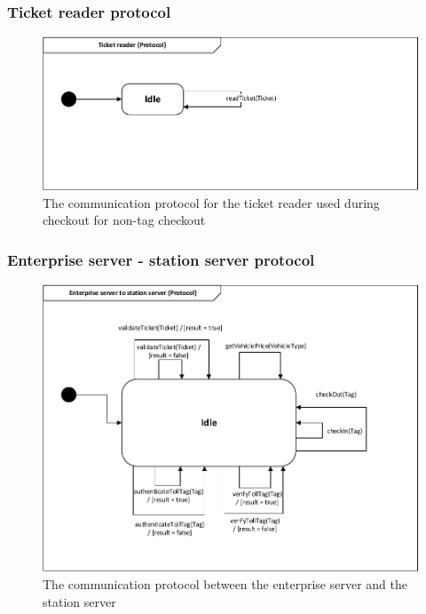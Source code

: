 \subsubsection*{Ticket reader protocol}
\begin{figure}[H]
\centering
\includegraphics[width=0.7\linewidth]{img/behaviour_state_machines/protocol_state_machines/protocol_state_machine_ticket_reader}
\caption{The communication protocol for the ticket reader used during checkout for non-tag checkout}
\label{fig:protocol_state_machine_ticket_reader}
\end{figure}

\subsubsection*{Enterprise server - station server protocol}
\begin{figure}[H]
\centering
\includegraphics[width=0.7\linewidth]{img/behaviour_state_machines/protocol_state_machines/protocol_state_machine_enterprise_server_to_station_server}
\caption{The communication protocol between the enterprise server and the station server}
\label{fig:protocol_state_machine_enterprise_server_to_station_server}
\end{figure}

